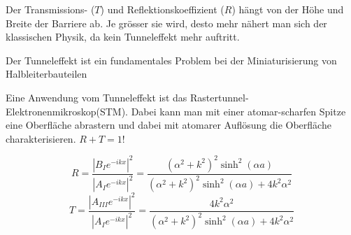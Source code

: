 Der Transmissions- ($T$) und Reflektionskoeffizient ($R$) hängt von der Höhe und Breite der Barriere ab. 
Je grösser sie wird, desto mehr nähert man sich der klassischen Physik, da kein Tunneleffekt mehr auftritt.

Der Tunneleffekt ist ein fundamentales Problem bei der Miniaturisierung von Halbleiterbauteilen

Eine Anwendung vom Tunneleffekt ist das Rastertunnel-Elektronenmikroskop(STM). 
Dabei kann man mit einer atomar-scharfen Spitze eine Oberfläche abrastern und 
dabei mit atomarer Auflösung die Oberfläche charakterisieren. $R+T = 1$!

$$ R = \dfrac{|B_Ie^{-ikx}|^2}{|A_Ie^{-ikx}|^2} = \frac{(\alpha^2 + k^2)^2 \sinh^2(\alpha a)}{(\alpha^2 + k^2)^2 \sinh^2(\alpha a) + 4k^2\alpha^2}$$
$$T = \dfrac{|A_{III}e^{-ikx}|^2}{|A_Ie^{-ikx}|^2} = \frac{4k^2\alpha^2}{(\alpha^2 + k^2)^2 \sinh^2(\alpha a) + 4k^2\alpha^2}  $$